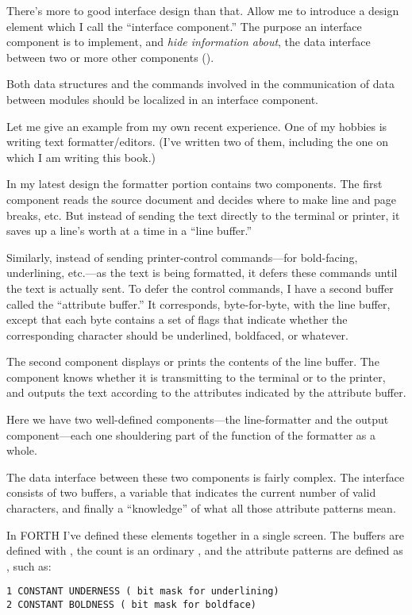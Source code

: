 There's more to good interface design than that. Allow me to introduce
a design element which I call the ``interface component.'' The purpose
an interface component is to implement, and \emph{hide information
about}, the data interface between two or more other components
().


\begin{tip}
Both data structures and the commands involved in the communication of
data between modules should be localized in an interface component.
\end{tip}

Let me give an example from my own recent experience. One of my hobbies
is writing text formatter/editors. (I've written two of them, including
the one on which I am writing this book.)

In my latest design the formatter portion contains two components.
The first component reads the source document and decides where to
make line and page breaks, etc. But instead of sending the text directly to
the terminal or printer, it saves up a line's worth at a time in a ``line
buffer.''

Similarly, instead of sending printer-control commands---for
bold-facing, underlining, etc.---as the text is being formatted, it
defers these commands until the text is actually sent. To defer the
control commands, I have a second buffer called the ``attribute
buffer.'' It corresponds, byte-for-byte, with the line buffer, except
that each byte contains a set of flags that indicate whether the
corresponding character should be underlined, boldfaced, or whatever.

The second component displays or prints the contents of the line
buffer. The component knows whether it is transmitting to the terminal
or to the printer, and outputs the text according to the attributes
indicated by the attribute buffer.

Here we have two well-defined components---the line-formatter and
the output component---each one shouldering part of the function of the
formatter as a whole.

The data interface between these two components is fairly complex.
The interface consists of two buffers, a variable that indicates the current
number of valid characters, and finally a ``knowledge'' of what all those
attribute patterns mean.

In FORTH I've defined these elements together in a single screen.
The buffers are defined with , the count is an ordinary
, and the attribute patterns are defined as ,
such as:
\begin{verbatim}
1 CONSTANT UNDERNESS ( bit mask for underlining)
2 CONSTANT BOLDNESS ( bit mask for boldface)
\end{verbatim}

